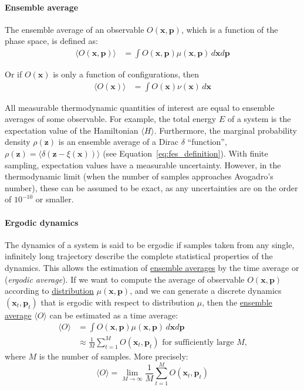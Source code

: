 \documentclass[9pt,review]{livecoms}
\newcommand{\vx}{\mathbf{x}}
\newcommand{\vp}{\mathbf{p}}
\newcommand{\vz}{\mathbf{z}}
\begin{document}
\hypertarget{ref:ensemble_average} {\paragraph{Ensemble average}}

The ensemble average of an observable $O(\vx,\vp)$, which is a function of the phase space, is defined as:
\begin{align}
\langle O(\vx,\vp) \rangle &= \int O(\vx, \vp) \mu(\vx, \vp) \, d\vx d\vp
\end{align}

Or if $O(\vx)$ is only a function of configurations, then
\begin{align}
\langle O(\vx) \rangle &= \int O(\vx) \nu(\vx) \, d\vx
\end{align}

All measurable thermodynamic quantities of interest are equal to ensemble averages of some observable. For example, the total energy $E$ of a system is the expectation value of the Hamiltonian $\langle H \rangle$. Furthermore, the marginal probability density $\rho(\vz)$ is an ensemble average of a Dirac $\delta$ ``function'', $\rho(\vz)=\langle \delta\left(\vz-\xi(\vx)\right) \rangle$ (see Equation~\ref{eq:fes_definition}).  With finite sampling, expectation values have a measurable uncertainty. However, in the thermodynamic limit (when the number of samples approaches Avogadro's number), these can be assumed to be exact, as any uncertainties are on the order of $10^{-10}$ or smaller.  

\hypertarget{ref:ergodic} {\paragraph{Ergodic dynamics}}
The dynamics of a system is said to be ergodic if samples taken from any single, infinitely long trajectory describe the complete statistical properties of the dynamics.
This allows the estimation of \hyperlink{ref:ensemble_average} {ensemble averages} by the time average or (\textit{ergodic average}).
If we want to compute the average of observable $O(\vx, \vp)$ according to \hyperlink{ref:Distribution} {distribution} $\mu(\vx, \vp)$, and we can generate a discrete dynamics $(\vx_t, \vp_t)$ that is ergodic with respect to distribution $\mu$, then the \hyperlink{ref:ensemble_average} {ensemble average} $\langle O \rangle$ can be estimated as a time average:
\begin{align}
\langle O \rangle &= \int O(\vx, \vp) \mu(\vx, \vp) \, d\vx d\vp
\nonumber \\
&\approx \frac{1}{M} \sum_{t=1}^M O(\vx_t, \vp_t) \text{ for sufficiently large $M$,}
\end{align}
where $M$ is the number of samples. More precisely:
\begin{equation}
   \langle O \rangle = \lim_{M \to \infty} \frac{1}{M} \sum_{t=1}^M O(\vx_t, \vp_t)
    \label{eq:ergodic}
\end{equation}
\end{document}
